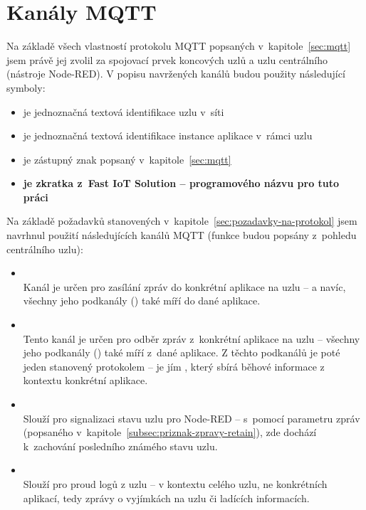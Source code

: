\section{Kanály MQTT}\label{sec:mqtt-kanaly}
Na základě všech vlastností protokolu MQTT popsaných v~kapitole~\ref{sec:mqtt} jsem právě jej zvolil za spojovací
prvek koncových uzlů a uzlu centrálního (nástroje Node-RED).
V popisu navržených kanálů budou použity následující symboly:
\begin{itemize}
    \item {} je jednoznačná textová identifikace uzlu v~síti
    \item {} je jednoznačná textová identifikace instance aplikace v~rámci uzlu
    \item \ic{\#} je zástupný znak popsaný v~kapitole~\ref{sec:mqtt}
    \item {} \textbf{je zkratka z~Fast IoT Solution -- programového názvu pro tuto práci}
\end{itemize}

Na základě požadavků stanovených v~kapitole~\ref{sec:pozadavky-na-protokol} jsem navrhnul použití následujících
kanálů MQTT (funkce budou popsány z~pohledu centrálního uzlu):

\begin{itemize}
    \item {} \\
    Kanál je určen pro zasílání zpráv do konkrétní aplikace na uzlu -- a navíc,
    všechny jeho podkanály () také míří do dané aplikace.

    \item {} \\
    Tento kanál je určen pro odběr zpráv z~konkrétní aplikace na uzlu --
    všechny jeho podkanály () také míří z~dané aplikace.
    Z těchto podkanálů je poté jeden stanovený protokolem -- je jím , který sbírá běhové informace z kontextu
    konkrétní aplikace.

    \item {} \\
    Slouží pro signalizaci stavu uzlu pro Node-RED -- s~pomocí parametru zpráv  (popsaného
    v~kapitole~\ref{subsec:priznak-zpravy-retain}), zde dochází k~zachování posledního známého stavu uzlu.

    \item {} \\
    Slouží pro proud logů z uzlu -- v kontextu celého uzlu, ne konkrétních aplikací, tedy zprávy o vyjímkách na uzlu
    či ladících informacích.
\end{itemize}

